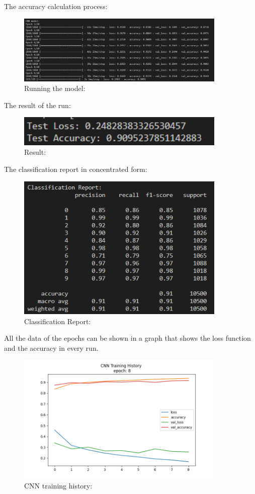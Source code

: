 \documentclass{article}
\begin{document}
The accuracy calculation process:

\begin{figure}[H]
    \caption{Running the model:}
    \centering
    \includegraphics[width=10cm]{imgFolder/RunningCNNModel.png}
\end{figure}

The result of the run:
\begin{figure}[H]
    \caption{Result:}
    \centering
    \includegraphics[width=10cm]{imgFolder/CNNResult.png}
\end{figure}

The classification report in concentrated form:
\begin{figure}[H]
    \caption{Classification Report:}
    \centering
    \includegraphics[width=10cm]{imgFolder/classificationReportCNN.png}
\end{figure}

All the data of the epochs can be shown in a graph that shows the loss function and the accuracy in every run.
\begin{figure}[H]
    \caption{CNN training history:}
    \centering
    \includegraphics[width=10cm]{imgFolder/CNN_fig.png}
\end{figure}
\end{document}
